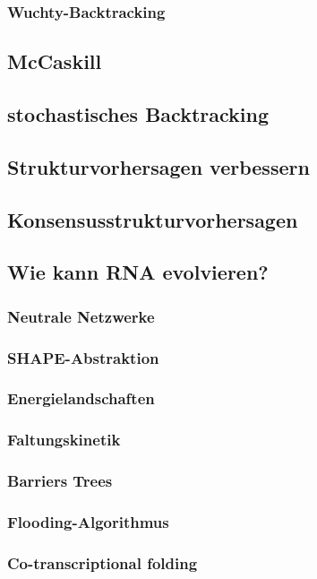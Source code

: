 \documentclass[12pt,a4paper]{article}
\begin{document}
\subsubsection{Wuchty-Backtracking}

\subsection{McCaskill}

\subsection{stochastisches Backtracking}

\subsection{Strukturvorhersagen verbessern}

\subsection{Konsensusstrukturvorhersagen}

\subsection{Wie kann RNA evolvieren?}

\subsubsection{Neutrale Netzwerke}

\subsubsection{SHAPE-Abstraktion}

\subsubsection{Energielandschaften}

\subsubsection{Faltungskinetik}

\subsubsection{Barriers Trees}

\subsubsection{Flooding-Algorithmus}

\subsubsection{Co-transcriptional folding}

\newpage



\newpage


\end{document}
